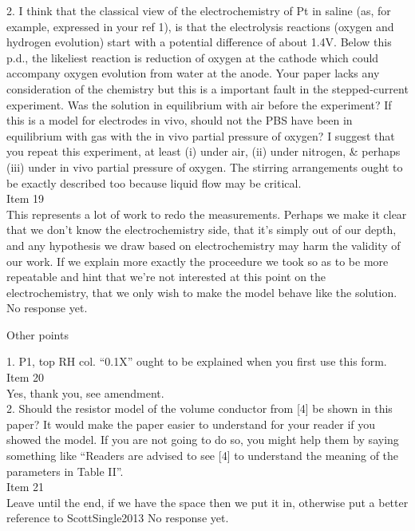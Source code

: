 \documentclass[journal, a4paper]{IEEEtran}
\begin{document}
{{2. I think that the classical view of the electrochemistry of Pt in saline (as, for example, expressed in your ref 1), is that the electrolysis reactions (oxygen and hydrogen evolution) start with a potential difference of about 1.4V. Below this p.d., the likeliest reaction is reduction of oxygen at the cathode which could accompany oxygen evolution from water at the anode. Your paper lacks any consideration of the chemistry but this is a important fault in the stepped-current experiment. Was the solution in equilibrium with air before the experiment? If this is a model for electrodes in vivo, should not the PBS have been in equilibrium with gas with the in vivo partial pressure of oxygen? I suggest that you repeat this experiment, at least (i) under air, (ii) under nitrogen, & perhaps (iii) under in vivo partial pressure of oxygen. The stirring arrangements ought to be exactly described too because liquid flow may be critical.\\
{\color{OliveGreen}
    Item 19\\
    {\color{Red} This represents a lot of work to redo the measurements. Perhaps we make it clear that we don't know the electrochemistry side, that it's simply out of our depth, and any hypothesis we draw based on electrochemistry may harm the validity of our work. If we explain more exactly the proceedure we took so as to be more repeatable and hint that we're not interested at this point on the electrochemistry, that we only wish to make the model behave like the solution.}
    No response yet.
}

Other points

1. P1, top RH col. ``0.1X'' ought to be explained when you first use this form.\\
{\color{OliveGreen}
    Item 20\\
    Yes, thank you, see amendment.
}\\

2. Should the resistor model of the volume conductor from [4] be shown in this paper? It would make the paper easier to understand for your reader if you showed the model. If you are not going to do so, you might help them by saying something like ``Readers are advised to see [4] to understand the meaning of the parameters in Table II''.\\
{\color{OliveGreen}
    Item 21\\
    {\color{Red} Leave until the end, if we have the space then we put it in, otherwise put a better reference to ScottSingle2013}
    No response yet.
}\\

}}
\end{document}
